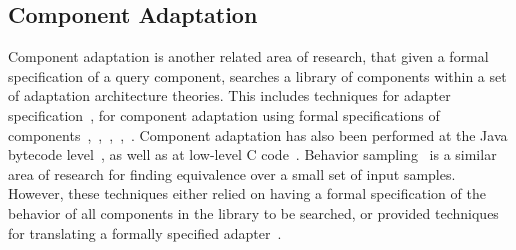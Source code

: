 \subsection{Component Adaptation}
Component adaptation is another related area of research, that given a
formal specification of a query component, searches a library of
components within a set of adaptation architecture theories.
%
This includes techniques for adapter specification~\cite{nimble}, for component adaptation using formal specifications of components~\cite{spartacus},~\cite{penix},~\cite{penix1995},~\cite{yellin},~\cite{bracciali}.
%
Component adaptation has also been performed at the Java bytecode
level~\cite{keller}, as well as at low-level C code~\cite{nita}.
%
Behavior sampling~\cite{podgurski} is a similar area of research for finding equivalence over a small set of input samples.
%
However, these techniques either relied on having a formal specification of the behavior of all components in the library to be searched, or provided techniques for translating a formally specified adapter~\cite{nimble}.

